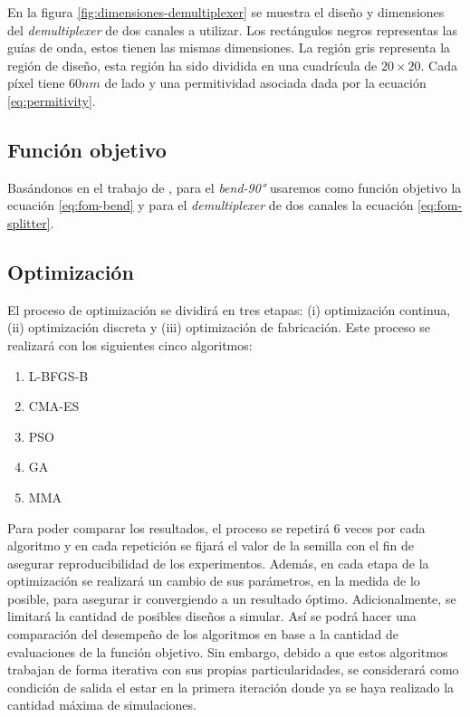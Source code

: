 En la figura \ref{fig:dimensiones-demultiplexer} se muestra el diseño y dimensiones del \emph{demultiplexer} de dos canales a utilizar.
Los rectángulos negros representas las guías de onda, estos tienen las mismas dimensiones.
La región gris representa la región de diseño, esta región ha sido dividida en una cuadrícula de $20 \times 20$.
Cada píxel tiene $60 nm$ de lado y una permitividad asociada dada por la ecuación \ref{eq:permitivity}.

\subsection{Función objetivo}

Basándonos en el trabajo de \cite{Su2020}, para el \emph{bend-90°} usaremos como función objetivo la ecuación \ref{eq:fom-bend} y para el \emph{demultiplexer} de dos canales la ecuación \ref{eq:fom-splitter}.

\subsection{Optimización}

El proceso de optimización se dividirá en tres etapas: (i) optimización continua, (ii) optimización discreta y (iii) optimización de fabricación.
Este proceso se realizará con los siguientes cinco algoritmos:

\begin{enumerate}

  \item L-BFGS-B
  \item CMA-ES
  \item PSO
  \item GA
  \item MMA

\end{enumerate}

Para poder comparar los resultados, el proceso se repetirá 6 veces por cada algoritmo y en cada repetición se fijará el valor de la semilla con el fin de asegurar reproducibilidad de los experimentos.
Además, en cada etapa de la optimización se realizará un cambio de sus parámetros, en la medida de lo posible, para asegurar ir convergiendo a un resultado óptimo.
Adicionalmente, se limitará la cantidad de posibles diseños a simular.
Así se podrá hacer una comparación del desempeño de los algoritmos en base a la cantidad de evaluaciones de la función objetivo.
Sin embargo, debido a que estos algoritmos trabajan de forma iterativa con sus propias particularidades, se considerará como condición de salida el estar en la primera iteración donde ya se haya realizado la cantidad máxima de simulaciones.

